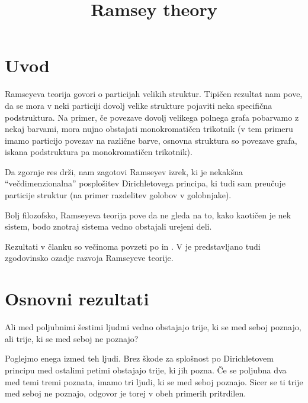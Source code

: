 \documentclass[twoside,11pt]{article}
\begin{document}



\title{Ramsey theory}

\glava\baselineskip=14.5pt

\smallskip

\section{Uvod}

Ramseyeva teorija govori o particijah velikih struktur. Tipičen rezultat nam pove, da 
se mora v neki particiji dovolj velike strukture pojaviti neka specifična podstruktura. Na primer, 
če povezave dovolj velikega polnega grafa pobarvamo z nekaj barvami, mora nujno obstajati 
monokromatičen trikotnik (v tem primeru imamo particijo povezav na različne barve, 
osnovna struktura so povezave grafa, iskana podstruktura pa monokromatičen trikotnik).

Da zgornje res drži, nam zagotovi Ramseyev izrek, ki je nekakšna ``večdimenzionalna'' posplošitev 
Dirichletovega principa, ki tudi sam preučuje particije struktur (na primer razdelitev golobov v
golobnjake).

Bolj filozofsko, Ramseyeva teorija pove da ne gleda na to, kako kaotičen je nek sistem, 
bodo znotraj sistema vedno obstajali urejeni deli.

Rezultati v članku so večinoma povzeti po \cite{west} in \cite{color}. V \cite{color} je 
predstavljano tudi zgodovinsko ozadje razvoja Ramseyeve teorije.

\section{Osnovni rezultati}
\begin{zgled}
    Ali med poljubnimi šestimi ljudmi vedno obstajajo trije, ki se med seboj
    poznajo, ali trije, ki se med seboj ne poznajo?

    Poglejmo enega izmed teh ljudi. Brez škode za splošnost po Dirichletovem principu med 
    ostalimi petimi obstajajo trije, ki jih pozna. Če se poljubna dva med temi tremi poznata, 
    imamo tri ljudi, ki se med seboj poznajo. Sicer se ti trije med seboj ne poznajo, odgovor je 
    torej v obeh primerih pritrdilen.
\end{zgled}
\end{document}
